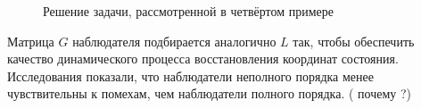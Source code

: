 \documentclass[preprint,russian,a5paper,10pt,twoside,mediummath]{ncc}
\newcommand*{\mysum}[3][]{
	\node[circle,thick,inner sep=0pt,minimum size=2ex] (#3) [#2] {};
	\foreach \i in {#1} {
		\fill[black!50] let \p1 = ($ (#3.east) - (#3.center) $), \n1 = {veclen(\x1,\y1)}, \n2 = { -135 + 90*\i ) } in
			(#3.center) -- ++(\n2:\n1) arc (\n2:{ \n2 + 90 }:\n1) -- cycle;
	}
	\draw[semithick] (#3.north west) -- (#3.south east)
					  (#3.south west) -- (#3.north east);
	\draw[thick] let \p1 = ($ (#3.east) - (#3.center) $), \n1 = {veclen(\x1,\y1)} in (#3.center) circle (\n1);
}
\begin{document}
\begin{figure}[ht]
\begin{tikzpicture}

	
	
	
\end{tikzpicture}
\footnotesize \caption{Решение задачи, рассмотренной в четвёртом примере\label{fig:extremum:fourth_example}}
\end{figure}

Матрица $G$ наблюдателя подбирается аналогично $L$ так, чтобы обеспечить качество динамического процесса восстановления координат состояния. Исследования показали, что наблюдатели неполного порядка менее чувствительны к помехам, чем наблюдатели полного порядка. ( почему ?)
\\
\end{document}
